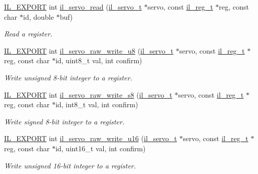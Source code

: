 \begin{DoxyCompactItemize}
\hyperlink{common_8h_a6bb629d26c52bfe10519ba3176853f47}{I\+L\+\_\+\+E\+X\+P\+O\+RT} int \hyperlink{group__IL__SERVO_gad3b94f5a9811dd5a52bb306e92f92944}{il\+\_\+servo\+\_\+read} (\hyperlink{group__IL__SERVO_ga3369ddfcc33492fe3a28f96cf455b13e}{il\+\_\+servo\+\_\+t} $\ast$servo, const \hyperlink{structil__reg__t}{il\+\_\+reg\+\_\+t} $\ast$reg, const char $\ast$id, double $\ast$buf)
\begin{DoxyCompactList}\small\item\em Read a register. \end{DoxyCompactList}\item 
\hyperlink{common_8h_a6bb629d26c52bfe10519ba3176853f47}{I\+L\+\_\+\+E\+X\+P\+O\+RT} int \hyperlink{group__IL__SERVO_ga05c1c7c4d30c882744008de007686f3f}{il\+\_\+servo\+\_\+raw\+\_\+write\+\_\+u8} (\hyperlink{group__IL__SERVO_ga3369ddfcc33492fe3a28f96cf455b13e}{il\+\_\+servo\+\_\+t} $\ast$servo, const \hyperlink{structil__reg__t}{il\+\_\+reg\+\_\+t} $\ast$reg, const char $\ast$id, uint8\+\_\+t val, int confirm)
\begin{DoxyCompactList}\small\item\em Write unsigned 8-\/bit integer to a register. \end{DoxyCompactList}\item 
\hyperlink{common_8h_a6bb629d26c52bfe10519ba3176853f47}{I\+L\+\_\+\+E\+X\+P\+O\+RT} int \hyperlink{group__IL__SERVO_gafea21fc3b0adb4208a0571c87f979c50}{il\+\_\+servo\+\_\+raw\+\_\+write\+\_\+s8} (\hyperlink{group__IL__SERVO_ga3369ddfcc33492fe3a28f96cf455b13e}{il\+\_\+servo\+\_\+t} $\ast$servo, const \hyperlink{structil__reg__t}{il\+\_\+reg\+\_\+t} $\ast$reg, const char $\ast$id, int8\+\_\+t val, int confirm)
\begin{DoxyCompactList}\small\item\em Write signed 8-\/bit integer to a register. \end{DoxyCompactList}\item 
\hyperlink{common_8h_a6bb629d26c52bfe10519ba3176853f47}{I\+L\+\_\+\+E\+X\+P\+O\+RT} int \hyperlink{group__IL__SERVO_gae504512849138dc97ab7e5c51a1a6a02}{il\+\_\+servo\+\_\+raw\+\_\+write\+\_\+u16} (\hyperlink{group__IL__SERVO_ga3369ddfcc33492fe3a28f96cf455b13e}{il\+\_\+servo\+\_\+t} $\ast$servo, const \hyperlink{structil__reg__t}{il\+\_\+reg\+\_\+t} $\ast$reg, const char $\ast$id, uint16\+\_\+t val, int confirm)
\begin{DoxyCompactList}\small\item\em Write unsigned 16-\/bit integer to a register. \end{DoxyCompactList}\item 

\end{DoxyCompactItemize}
